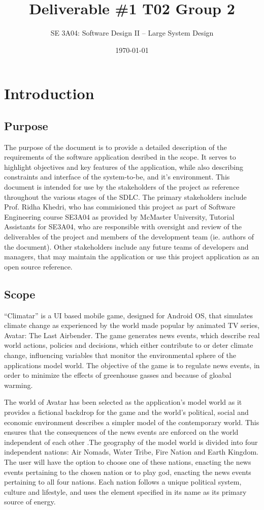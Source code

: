 \documentclass[]{article}
\title{Deliverable \#1 T02 Group 2}
\author{SE 3A04: Software Design II -- Large System Design}
\date{\today}
\begin{document}
\maketitle	

\section{Introduction}
\label{sec:introduction}
\subsection{Purpose}
\label{sub:purpose}
	The purpose of the document is to provide a detailed description of the requirements of the software application desribed in the scope. It serves to highlight objectives and key features of the application, while also describing constraints and interface of the system-to-be, and it's environment. This document is intended for use by the stakeholders of the project as reference throughout the various stages of the SDLC. The primary stakeholders include Prof. Ridha Khedri, who has commisioned this project as part of Software Engineering course SE3A04 as provided by McMaster University, Tutorial Assistants for SE3A04, who are responsible with oversight and review of the deliverables of the project and members of the development team (ie. authors of the document). Other stakeholders include any future teams of developers and managers, that may maintain the application or use this project application as an open source reference. 

\subsection{Scope}
\label{sub:scope}
	“Climatar” is a UI based mobile game, designed for Android OS, that simulates climate change as experienced by the world made popular by animated TV series, Avatar: The Last Airbender. The game generates news events, which describe real world actions, policies and decisions, which either contribute to or deter climate change, influencing variables that monitor the environmental sphere of the applications model world. The objective of the game is to regulate news events, in order to minimize the effects of greenhouse gasses and because of gloabal warming.

The world of Avatar has been selected as the application's model world as it provides a fictional backdrop for the game and the world's political, social and economic environment describes a simpler model of the contemporary world. This ensures that the consequences of the news events are enforced on the world independent of each other .\cite{WoA}The geography of the model world is divided into four independent nations: Air Nomads, Water Tribe, Fire Nation and Earth Kingdom. The user will have the option to choose one of these nations, enacting the news events pertaining to the chosen nation or to play god, enacting the news events pertaining to all four nations. Each nation follows a unique political system, culture and lifestyle, and uses the element specified in its name as its primary source of energy. 
\end{document}
